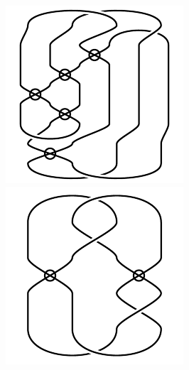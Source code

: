 \begin{figure}[H]
\begin{minipage}[b]{.18\linewidth}
\end{minipage}
\begin{minipage}[b]{.18\linewidth}
\centering
\includegraphics[width=\linewidth]{../data/virtual_4_104.png}
\end{minipage}
\begin{minipage}[b]{.18\linewidth}
\centering
\includegraphics[width=\linewidth]{../data/virtual_4_105.png}

\end{minipage}
\end{figure}
